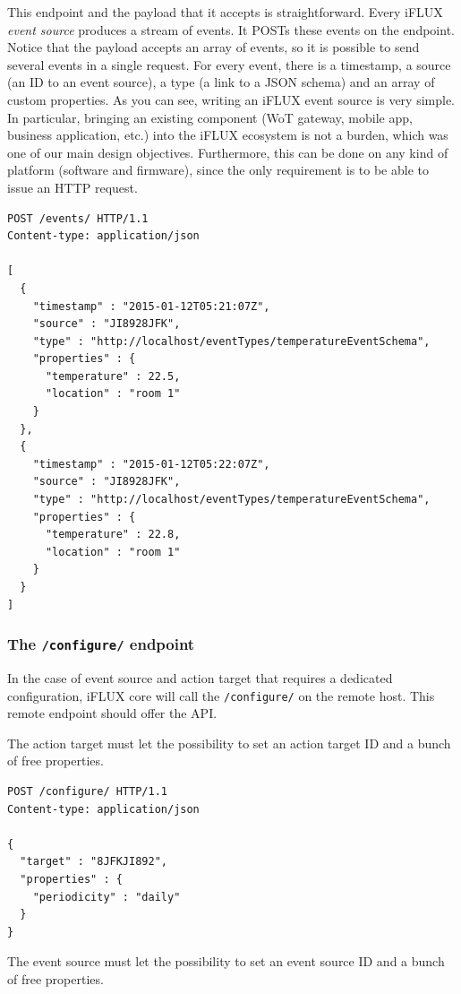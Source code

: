 This endpoint and the payload that it accepts is straightforward. Every iFLUX \emph{event source} produces a stream of events. It POSTs these events on the endpoint. Notice that the payload accepts an array of events, so it is possible to send several events in a single request. For every event, there is a timestamp, a source (an ID to an event source), a type (a link to a JSON schema) and an array of custom properties. As you can see, writing an iFLUX event source is very simple. In particular, bringing an existing component (WoT gateway, mobile app, business application, etc.) into the iFLUX ecosystem is not a burden, which was one of our main design objectives. Furthermore, this can be done on any kind of platform (software and firmware), since the only requirement is to be able to issue an HTTP request.

\begin{lstlisting}
POST /events/ HTTP/1.1
Content-type: application/json

[
  {
    "timestamp" : "2015-01-12T05:21:07Z",
    "source" : "JI8928JFK",
    "type" : "http://localhost/eventTypes/temperatureEventSchema",
    "properties" : {
      "temperature" : 22.5,
      "location" : "room 1"
    }
  },
  {
    "timestamp" : "2015-01-12T05:22:07Z",
    "source" : "JI8928JFK",
    "type" : "http://localhost/eventTypes/temperatureEventSchema",
    "properties" : {
      "temperature" : 22.8,
      "location" : "room 1"
    }
  }
]
\end{lstlisting}

\subsubsection{The \texttt{/configure/} endpoint}

In the case of event source and action target that requires a dedicated configuration, iFLUX core will call the \texttt{/configure/} on the remote host. This remote endpoint should offer the API.

The action target must let the possibility to set an action target ID and a bunch of free properties.

\begin{lstlisting}
POST /configure/ HTTP/1.1
Content-type: application/json

{
  "target" : "8JFKJI892",
  "properties" : {
    "periodicity" : "daily"
  }
}
\end{lstlisting}

The event source must let the possibility to set an event source ID and a bunch of free properties.

